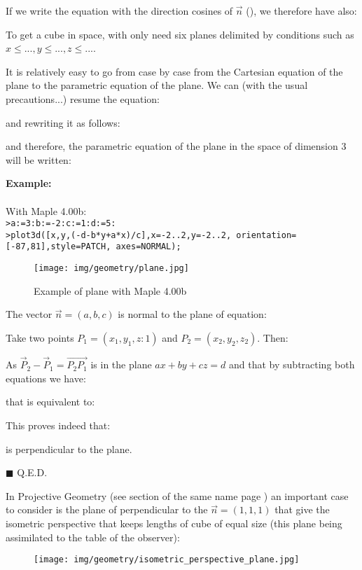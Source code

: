 	If we write the equation with the direction cosines of $\vec{n}$ (), we therefore have also:
	
	\begin{tcolorbox}[title=Remark,colframe=black,arc=10pt]
	To get a cube in space, with only need six planes delimited by conditions such as $x\leq...,y\leq...,z\leq...$.
	\end{tcolorbox}	
	It is relatively easy to go from case by case from the Cartesian equation of the plane to the parametric equation of the plane. We can (with the usual precautions...) resume the equation:
	
	and rewriting it as follows:
	
	and therefore, the parametric equation of the plane in the space of dimension $3$ will be written:
	
	\begin{tcolorbox}[colframe=black,colback=white,sharp corners]
	\textbf{{\Large {}}Example:}\\\\
	With Maple 4.00b:\\

	\texttt{>a:=3:b:=-2:c:=1:d:=5:\\
	>plot3d([x,y,(-d-b*y+a*x)/c],x=-2..2,y=-2..2, orientation=[-87,81],style=PATCH,
axes=NORMAL);
	}
	\begin{figure}[H]
		\centering
		\texttt{[image: img/geometry/plane.jpg]}
		\caption{Example of plane with Maple 4.00b}
	\end{figure}
	\end{tcolorbox}
	\begin{theorem}
	The vector $\vec{n}=(a,b,c)$ is normal to the plane of equation:
	
	\end{theorem}
	\begin{dem}
	Take two points $P_1=(x_1,y_1,z:1)$ and $P_2=(x_2,y_2,z_2)$. Then:
	
	As $\vec{P}_2-\vec{P}_1=\overrightarrow{P_2P_1}$ is in the plane $ax+by+cz=d$ and that by subtracting both equations we have:
	
	that is equivalent to:
	
	This proves indeed that\label{vector normal plane}:
	
	is perpendicular to the plane.
	\begin{flushright}
		$\blacksquare$  Q.E.D.
	\end{flushright}
	\end{dem}
	In Projective Geometry (see section of the same name page \pageref{projective geometry}) an important case to consider is the plane of perpendicular to the $\vec{n}=(1,1,1)$ that give the isometric perspective that keeps lengths of cube of equal size (this plane being assimilated to the table of the observer)\label{isometric plane}:
	\begin{figure}[H]
		\centering
		\texttt{[image: img/geometry/isometric\_perspective\_plane.jpg]}
	\end{figure}

